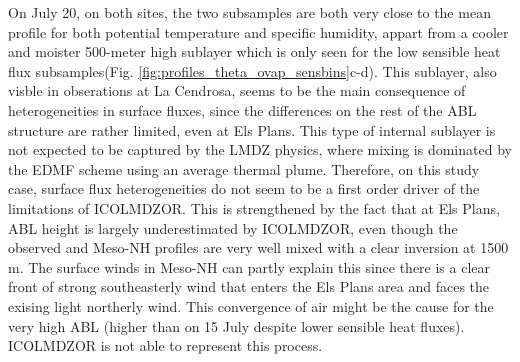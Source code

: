On July 20, on both sites, the two subsamples are both very close to the mean profile for both potential temperature and specific humidity, appart from a cooler and moister 500-meter high sublayer which is only seen for the low sensible heat flux subsamples(Fig. \ref{fig:profiles_theta_ovap_sensbins}c-d). This sublayer, also visble in obserations at La Cendrosa, seems to be the main consequence of heterogeneities in surface fluxes, since the differences on the rest of the ABL structure are rather limited, even at Els Plans.
This type of internal sublayer is not expected to be captured by the LMDZ physics, where mixing is dominated by the EDMF scheme using an average thermal plume. Therefore, on this study case, surface flux heterogeneities do not seem to be a first order driver of the limitations of ICOLMDZOR. This is strengthened by the fact that at Els Plans, ABL height is largely underestimated by ICOLMDZOR, even though the observed and Meso-NH profiles are very well mixed with a clear inversion at 1500 m.
The surface winds in Meso-NH can partly explain this since there is a clear front of strong southeasterly wind that enters the Els Plans area and faces the exising light northerly wind. This convergence of air might be the cause for the very high ABL (higher than on 15 July despite lower sensible heat fluxes). ICOLMDZOR is not able to represent this process.


